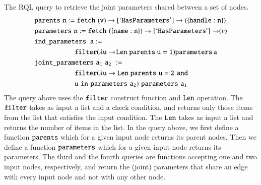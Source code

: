 \begin{example}
\label{ex:joint}
The RQL query to retrieve the joint parameters shared between a set of nodes.
{\small
\begin{align}
&{\tt {parents} \,\, n := fetch \,\, (v)\rightarrow [`HasParameters']\rightarrow  (\{handle:n\}) }\nonumber \\
& {\tt {parameters} \,\, n :=  fetch \,\, (\{name:n\})\rightarrow [`HasParameters']\rightarrow }  (v)  \nonumber  \\
& {\tt {ind\_parameters}\;\; a := }  \cr
&{\tt \hspace*{2cm} filter (\lambda u \rightarrow\! {Len \; parents}\; u = 1)     {parameters}\, a \nonumber } \\
& {\tt {joint\_parameters} \,\, a_1 \,\, a_2\,\, := } \cr
& {\tt \hspace*{2cm} filter (\lambda u \rightarrow {Len\; parents}\,\, u = 2\,\, and } \cr
& {\tt \hspace*{2cm}  u \,\, in \,\, {parameters}\,\, a_2)    \,\,{parameters}\,\, a_1 \nonumber}
\end{align}
}
The query above uses the ${\tt filter}$ construct function and ${\tt Len}$ operation. The ${\tt filter}$ takes as input a list and a check condition, and returns only those items from the list that satisfies the input condition. The ${\tt Len}$ takes as input a list and returns the number of items in the list.
In the query above, we first define a function ${\tt parents}$ which for a given input node returns its parent nodes. Then we define a function ${\tt parameters}$ which for a given input node returns its parameters. The third and the fourth queries are functions accepting one and two input nodes, respectively, and return the (joint) parameters that share an edge with every input node and not with any other node.
\end{example}
